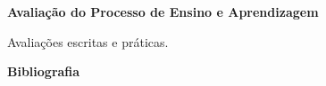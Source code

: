 









\begin{snugshade}\begin{center}\textbf{
    Avaliação do Processo de Ensino e Aprendizagem
}\end{center}\end{snugshade}

\noindent
          Avaliações escritas e pr\'aticas.




\begin{snugshade}\begin{center}\textbf{
    Bibliografia
}\end{center}\end{snugshade}

